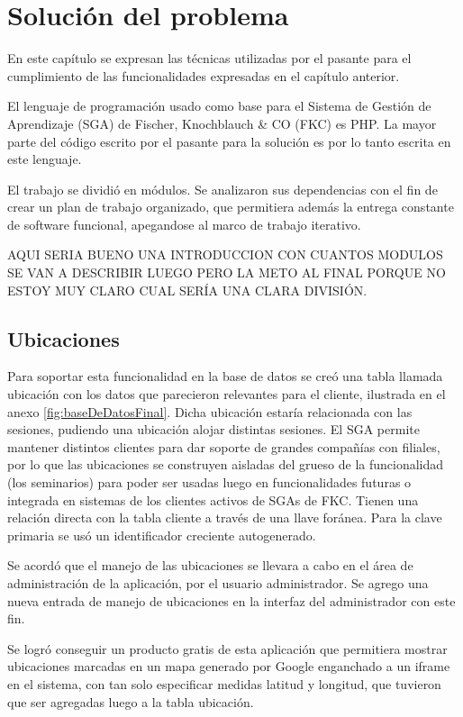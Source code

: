 \chapter{Solución del problema}
\thispagestyle{empty} %

En este capítulo se expresan las técnicas utilizadas por el pasante para el cumplimiento de las funcionalidades expresadas en el capítulo anterior.

El lenguaje de programación usado como base para el Sistema de Gestión de Aprendizaje (SGA) de Fischer, Knochblauch \& CO (FKC) es PHP. La mayor parte del código escrito por el pasante para la solución es por lo tanto escrita en este lenguaje.

El trabajo se dividió en módulos. Se analizaron sus dependencias con el fin de crear un plan de trabajo organizado, que permitiera además la entrega constante de software funcional, apegandose al marco de trabajo iterativo.

AQUI SERIA BUENO UNA INTRODUCCION CON CUANTOS MODULOS SE VAN A DESCRIBIR LUEGO PERO LA METO AL FINAL PORQUE NO ESTOY MUY CLARO CUAL SERÍA UNA CLARA DIVISIÓN.

	\section{Ubicaciones} %
	\label{sec:ubicaciones}
	
	Para soportar esta funcionalidad en la base de datos se creó una tabla llamada ubicación con los datos que parecieron relevantes para el cliente, ilustrada en el anexo \ref{fig:baseDeDatosFinal}. Dicha ubicación estaría relacionada con las sesiones, pudiendo una ubicación alojar distintas sesiones. El SGA permite mantener distintos clientes para dar soporte de grandes compañías con filiales, por lo que las ubicaciones se construyen aisladas del grueso de la funcionalidad (los seminarios) para poder ser usadas luego en funcionalidades futuras o integrada en sistemas de los clientes activos de SGAs de FKC. Tienen una relación directa con la tabla cliente a través de una llave foránea. Para la clave primaria se usó un identificador creciente autogenerado.

	Se acordó que el manejo de las ubicaciones se llevara a cabo en el área de administración de la aplicación, por el usuario administrador. Se agrego una nueva entrada de manejo de ubicaciones en la interfaz del administrador con este fin.

	Se logró conseguir un producto gratis de esta aplicación que permitiera mostrar ubicaciones marcadas en un mapa generado por Google enganchado a un iframe en el sistema, con tan solo especificar medidas latitud y longitud, que tuvieron que ser agregadas luego a la tabla ubicación.

